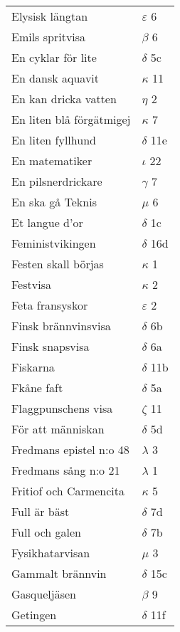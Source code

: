 \documentclass[a6paper,10pt]{article}
\begin{document}
\newpage
\begin{table}[!h]
\begin{tabular}{l l}
Elysisk längtan&$\varepsilon$ 6\\
Emils spritvisa&$\beta$ 6\\
En cyklar för lite&	$\delta$ 5c\\
En dansk aquavit&$\kappa$ 11\\
En kan dricka vatten&	$\eta$ 2\\
En liten blå förgätmigej&$\kappa$ 7\\
En liten fyllhund&$\delta$ 11e\\
En matematiker&$\iota$ 22\\
En pilsnerdrickare&$\gamma$ 7\\
En ska gå Teknis&	$\mu$ 6\\
Et langue d'or&$\delta$ 1c\\
Feministvikingen&$\delta$ 16d\\
Festen skall börjas&$\kappa$ 1\\
Festvisa&$\kappa$ 2\\
Feta fransyskor&$\varepsilon$ 2\\
Finsk brännvinsvisa&$\delta$ 6b\\
Finsk snapsvisa&$\delta$ 6a\\
Fiskarna&$\delta$ 11b\\
Fkåne faft&$\delta$ 5a\\
Flaggpunschens visa&$\zeta$ 11\\
För att människan&$\delta$ 5d\\
Fredmans epistel n:o 48	&$\lambda$ 3\\
Fredmans sång n:o 21&$\lambda$ 1\\
Fritiof och Carmencita&$\kappa$ 5\\
Full är bäst&$\delta$ 7d\\
Full och galen&$\delta$ 7b\\
Fysikhatarvisan&$\mu$ 3\\
Gammalt brännvin&$\delta$ 15c\\
Gasqueljäsen&$\beta$ 9\\
Getingen&$\delta$ 11f\\
\end{tabular}
\end{table}
\end{document}
